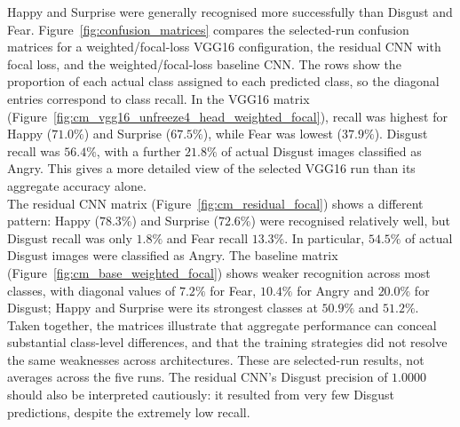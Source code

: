 \documentclass[10pt, a4paper]{article}
\begin{document}
				Happy and Surprise were generally recognised more successfully than Disgust and Fear. Figure~\ref{fig:confusion_matrices} compares the selected-run confusion matrices for a weighted/focal-loss VGG16 configuration, the residual CNN with focal loss, and the weighted/focal-loss baseline CNN. The rows show the proportion of each actual class assigned to each predicted class, so the diagonal entries correspond to class recall. In the VGG16 matrix (Figure~\ref{fig:cm_vgg16_unfreeze4_head_weighted_focal}), recall was highest for Happy ($71.0\%$) and Surprise ($67.5\%$), while Fear was lowest ($37.9\%$). Disgust recall was $56.4\%$, with a further $21.8\%$ of actual Disgust images classified as Angry. This gives a more detailed view of the selected VGG16 run than its aggregate accuracy alone.\\
				The residual CNN matrix (Figure~\ref{fig:cm_residual_focal}) shows a different pattern: Happy ($78.3\%$) and Surprise ($72.6\%$) were recognised relatively well, but Disgust recall was only $1.8\%$ and Fear recall $13.3\%$. In particular, $54.5\%$ of actual Disgust images were classified as Angry. The baseline matrix (Figure~\ref{fig:cm_base_weighted_focal}) shows weaker recognition across most classes, with diagonal values of $7.2\%$ for Fear, $10.4\%$ for Angry and $20.0\%$ for Disgust; Happy and Surprise were its strongest classes at $50.9\%$ and $51.2\%$. Taken together, the matrices illustrate that aggregate performance can conceal substantial class-level differences, and that the training strategies did not resolve the same weaknesses across architectures. These are selected-run results, not averages across the five runs. The residual CNN's Disgust precision of $1.0000$ should also be interpreted cautiously: it resulted from very few Disgust predictions, despite the extremely low recall.
				
\end{document}
